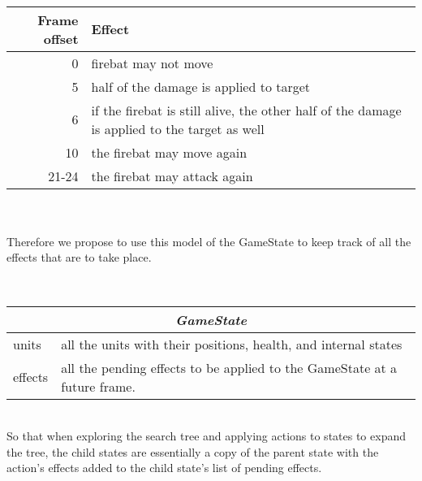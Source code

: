 \\
\begin{center}
\begin{tabular}{ r | p{} }
Frame offset & Effect \\
\hline
0 & firebat may not move \\
5 & half of the damage is applied to target \\
6 & if the firebat is still alive, the other half of the damage is applied to the target as well \\
10 & the firebat may move again \\
21-24 & the firebat may attack again
\end{tabular}
\end{center}
\\ \\

Therefore we propose to use this model of the GameState to keep track of all the effects that are to take place.

\\
\begin{center}
\begin{tabular}{ | l | p{} | }
\hline
\multicolumn{2}{|c|}{\emph{GameState}} \\
\hline
units		& all the units with their positions, health, and internal states \\
effects	& all the pending effects to be applied to the GameState at a future frame. \\
\hline
\end{tabular}
\end{center}
\\

So that when exploring the search tree and applying actions to states to expand the tree, the child states are essentially a copy of the parent state with the action's effects added to the child state's list of pending effects.